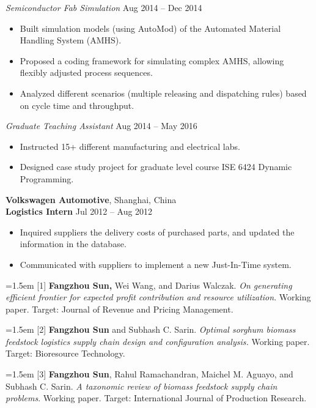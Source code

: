 \documentclass[11pt,letterpaper]{article}
\newcommand{\mhead}[1]{\leavevmode\marginpar{\small\sffamily #1}}
\begin{document}
\smallskip 
\textit{Semiconductor Fab Simulation} \hfill{{Aug 2014 -- Dec 2014}} 
\begin{itemize}
\item Built simulation models (using AutoMod) of the Automated Material Handling System (AMHS).
\item Proposed a coding framework for simulating complex AMHS, allowing flexibly adjusted process sequences.
\item Analyzed different scenarios (multiple releasing and dispatching rules) based on cycle time and throughput. 
\end{itemize}


\smallskip 
\textit{Graduate Teaching Assistant} \hfill{{Aug 2014 -- May 2016}} 
\begin{itemize}
	\item Instructed 15+ different manufacturing and electrical labs.
 	\item Designed case study project for graduate level course ISE 6424 Dynamic Programming.
\end{itemize}

\medskip
\textbf{Volkswagen Automotive}, Shanghai, China  \\
\textbf{Logistics Intern} \hfill{Jul 2012 -- Aug 2012}
\begin{itemize}
  \item Inquired suppliers the delivery costs of purchased parts, and updated the information in the database.
  \item Communicated with suppliers to implement a new Just-In-Time system.	
\end{itemize}

 
\bigskip
\mhead{Publications}%
\hangindent=1.5em [1] \textbf{Fangzhou Sun,} Wei Wang, and Darius Walczak. \emph{On generating efficient frontier for expected profit contribution and resource utilization}. Working paper. Target: Journal of Revenue and Pricing Management. 

\hangindent=1.5em [2] \textbf{Fangzhou Sun} and Subhash C. Sarin. \emph{Optimal sorghum biomass feedstock logistics supply chain design and configuration analysis.} Working paper. Target: Bioresource Technology.

\hangindent=1.5em [3] \textbf{Fangzhou Sun}, Rahul Ramachandran,  Maichel M. Aguayo, and Subhash C. Sarin. \emph{A taxonomic review of biomass feedstock supply chain problems}. Working paper. Target: International Journal of Production Research.
\end{document}
